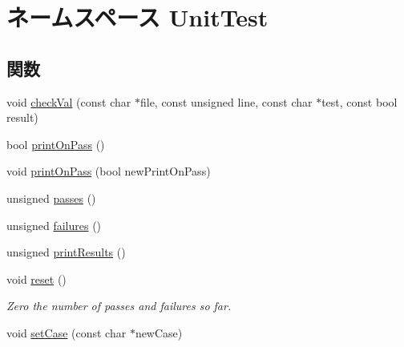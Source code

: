 \hypertarget{namespaceUnitTest}{
\section{ネームスペース UnitTest}
\label{namespaceUnitTest}
}
\subsection*{関数}
\begin{DoxyCompactItemize}
\item 
void \hyperlink{namespaceUnitTest_aaeea6aae1b9fc9fde2eb06e2cdb95b77}{checkVal} (const char $\ast$file, const unsigned line, const char $\ast$test, const bool result)
\item 
bool \hyperlink{namespaceUnitTest_a4fe39db6ba9297515e7cd97e88c6ad78}{printOnPass} ()
\item 
void \hyperlink{namespaceUnitTest_a6b02bd4200bdf54eee13e52e4dae4625}{printOnPass} (bool newPrintOnPass)
\item 
unsigned \hyperlink{namespaceUnitTest_a9638f40b9823e54879efe5e0c75a6bfe}{passes} ()
\item 
unsigned \hyperlink{namespaceUnitTest_a8c0151028e98183841c13b41f180a0d3}{failures} ()
\item 
unsigned \hyperlink{namespaceUnitTest_a19207173d818ba00e0b61392a76e04e9}{printResults} ()
\item 
void \hyperlink{namespaceUnitTest_ad20897c5c8bd47f5d4005989bead0e55}{reset} ()
\begin{DoxyCompactList}\small\item\em Zero the number of passes and failures so far. \item\end{DoxyCompactList}\item 
void \hyperlink{namespaceUnitTest_a4a369bd22c7170bddaa89e471e3620c6}{setCase} (const char $\ast$newCase)
\end{DoxyCompactItemize}


